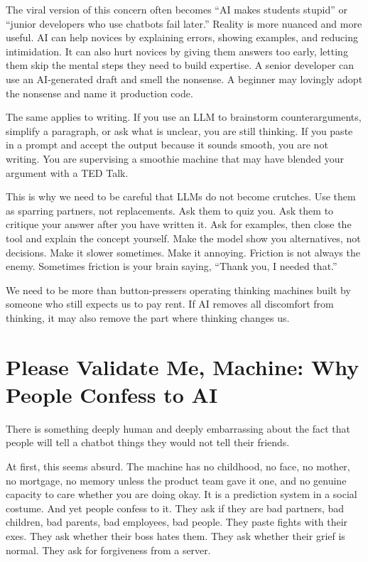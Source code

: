 \documentclass[12pt,oneside]{book}
\begin{document}
The viral version of this concern often becomes ``AI makes students stupid'' or ``junior developers who use chatbots fail later.'' Reality is more nuanced and more useful. AI can help novices by explaining errors, showing examples, and reducing intimidation. It can also hurt novices by giving them answers too early, letting them skip the mental steps they need to build expertise. A senior developer can use an AI-generated draft and smell the nonsense. A beginner may lovingly adopt the nonsense and name it production code.

The same applies to writing. If you use an LLM to brainstorm counterarguments, simplify a paragraph, or ask what is unclear, you are still thinking. If you paste in a prompt and accept the output because it sounds smooth, you are not writing. You are supervising a smoothie machine that may have blended your argument with a TED Talk.

This is why we need to be careful that LLMs do not become crutches. Use them as sparring partners, not replacements. Ask them to quiz you. Ask them to critique your answer after you have written it. Ask for examples, then close the tool and explain the concept yourself. Make the model show you alternatives, not decisions. Make it slower sometimes. Make it annoying. Friction is not always the enemy. Sometimes friction is your brain saying, ``Thank you, I needed that.''

We need to be more than button-pressers operating thinking machines built by someone who still expects us to pay rent. If AI removes all discomfort from thinking, it may also remove the part where thinking changes us.

\chapter{Please Validate Me, Machine: Why People Confess to AI}

There is something deeply human and deeply embarrassing about the fact that people will tell a chatbot things they would not tell their friends.

At first, this seems absurd. The machine has no childhood, no face, no mother, no mortgage, no memory unless the product team gave it one, and no genuine capacity to care whether you are doing okay. It is a prediction system in a social costume. And yet people confess to it. They ask if they are bad partners, bad children, bad parents, bad employees, bad people. They paste fights with their exes. They ask whether their boss hates them. They ask whether their grief is normal. They ask for forgiveness from a server.
\end{document}
